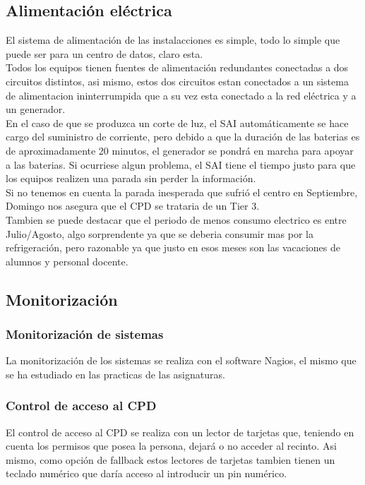 \documentclass[a4paper,11pt]{article}
\begin{document}
\subsection{Alimentación eléctrica}
El sistema de alimentación de las instalacciones es simple, todo lo simple que puede ser para un centro de datos, claro esta.\\
Todos los equipos tienen fuentes de alimentación redundantes conectadas a dos circuitos distintos, asi mismo, estos dos circuitos estan conectados a un sistema de alimentacion ininterrumpida que a su vez esta conectado a la red eléctrica y a un generador.\\
En el caso de que se produzca un corte de luz, el SAI automáticamente se hace cargo del suministro de corriente, pero debido a que la duración de las baterias es de aproximadamente 20 minutos, el generador se pondrá en marcha para apoyar a las baterias. Si ocurriese algun problema, el SAI tiene el tiempo justo para que los equipos realizen una parada sin perder la información.\\
Si no tenemos en cuenta la parada inesperada que sufrió el centro en Septiembre, Domingo nos asegura que el CPD se trataria de un Tier 3.\\
Tambien se puede destacar que el periodo de menos consumo electrico es entre Julio/Agosto, algo sorprendente ya que se deberia consumir mas por la refrigeración, pero razonable ya que justo en esos meses son las vacaciones de alumnos y personal docente.

\subsection{Monitorización}
\subsubsection{Monitorización de sistemas}
La monitorización de los sistemas se realiza con el software Nagios, el mismo que se ha estudiado en las practicas de las asignaturas.
\subsubsection{Control de acceso al CPD}
El control de acceso al CPD se realiza con un lector de tarjetas que, teniendo en cuenta los permisos que posea la persona, dejará o no acceder al recinto. Asi mismo, como opción de fallback estos lectores de tarjetas tambien tienen un teclado numérico que daría acceso al introducir un pin numérico.
\end{document}
